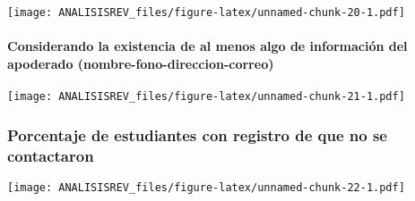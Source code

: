 \documentclass[
]{article}
\begin{document}
\texttt{[image: ANALISISREV\_files/figure-latex/unnamed-chunk-20-1.pdf]}

\hypertarget{considerando-la-existencia-de-al-menos-algo-de-informaciuxf3n-del-apoderado-nombre-fono-direccion-correo}{%
\paragraph{Considerando la existencia de al menos algo de información
del apoderado
(nombre-fono-direccion-correo)}\label{considerando-la-existencia-de-al-menos-algo-de-informaciuxf3n-del-apoderado-nombre-fono-direccion-correo}}

\texttt{[image: ANALISISREV\_files/figure-latex/unnamed-chunk-21-1.pdf]}

\hypertarget{porcentaje-de-estudiantes-con-registro-de-que-no-se-contactaron}{%
\subsubsection{Porcentaje de estudiantes con registro de que no se
contactaron}\label{porcentaje-de-estudiantes-con-registro-de-que-no-se-contactaron}}

\texttt{[image: ANALISISREV\_files/figure-latex/unnamed-chunk-22-1.pdf]}
\end{document}
